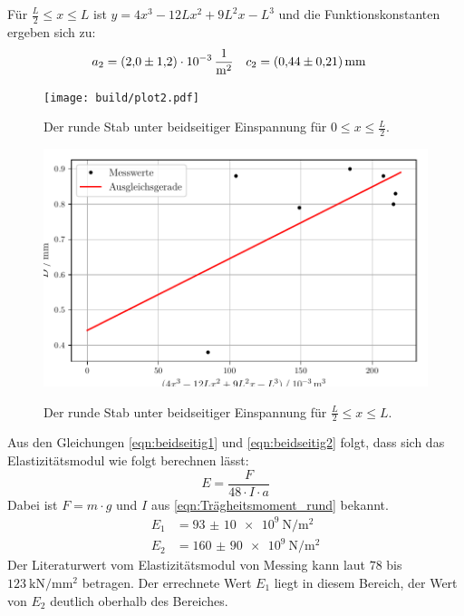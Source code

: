 Für $\frac{L}{2} \leq x \leq L$ ist $y = 4x^3 -12Lx^2 + 9L^2x -L^3$ und die Funktionskonstanten ergeben sich zu:
\begin{align*}
  a_2 &= \SI{2.0(12)e-3}{\per\metre\squared} & c_2 &= \SI{0.44 \pm 0.21}{\milli\meter}
\end{align*}
\begin{figure}
  \caption{Der runde Stab unter beidseitiger Einspannung für $0 \leq x \leq \frac{L}{2}$.}
  \texttt{[image: build/plot2.pdf]}
\end{figure}
\begin{figure}
  \centering
  \caption{Der runde Stab unter beidseitiger Einspannung für $\frac{L}{2} \leq x \leq L$.}
  \includegraphics[width= \textwidth]{plot22.pdf}
  \label{fig:rund_beid2}
\end{figure}
Aus den Gleichungen \eqref{eqn:beidseitig1} und \eqref{eqn:beidseitig2} folgt, dass sich das Elastizitätsmodul wie folgt berechnen lässt:
\begin{equation*}
  E = \frac{F}{48 \cdot I \cdot a}
\end{equation*}
Dabei ist $F = m\cdot g$ und $I$ aus \eqref{eqn:Trägheitsmoment_rund} bekannt.
\begin{align*}
  E_1 &= \SI{93(10)e9}{\newton\per\metre\squared}\\
  E_2 &= \SI{160(90)e9}{\newton\per\metre\squared}
\end{align*}
Der Literaturwert vom Elastizitätsmodul von Messing kann laut \cite{chemie.de} $\num{78}$ bis $\SI{123}{\kilo\newton\per\milli\metre\squared}$ betragen. 
Der errechnete Wert $E_1$ liegt in diesem Bereich, der Wert von $E_2$ deutlich oberhalb des Bereiches. 